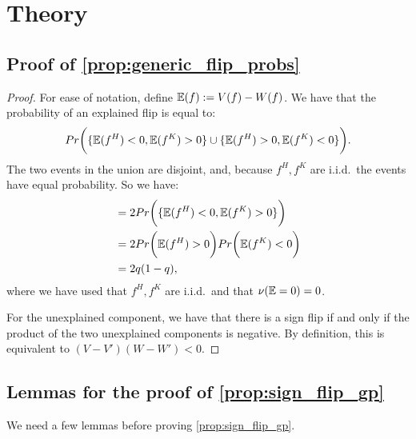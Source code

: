 \section{Theory}
\label{app:theory}

\subsection{Proof of \cref{prop:generic_flip_probs}}

\begin{proof}
	For ease of notation, define $\mathbb{E}(f) := V(f) - W(f)$. We have that the probability of an explained flip is equal to:
	\begin{equation*}
		Pr\bigg( \{\mathbb{E}(f^H) < 0, \mathbb{E}(f^K) > 0 \} \cup \{ \mathbb{E}(f^H) > 0, \mathbb{E}(f^K) < 0\} \bigg).
	\end{equation*}
	The two events in the union are disjoint, and, because $f^H, f^K$ are i.i.d.\, the events have equal probability. So we have:
	\begin{align*}
		&= 2 Pr\bigg( \{\mathbb{E}(f^H) < 0, \mathbb{E}(f^K) > 0 \} \bigg) \\
		&= 2 Pr\bigg( \mathbb{E}(f^H) > 0 \bigg) Pr\bigg( \mathbb{E}(f^K) < 0 \bigg) \\
		&= 2 q (1 - q),
	\end{align*}
	where we have used that $f^H, f^K$ are i.i.d.\ and that $\nu(\mathbb{E} = 0) = 0$.
	
	For the unexplained component, we have that there is a sign flip if and only if the product of the two unexplained components is negative. By definition, this is equivalent to $(V - V')(W - W') < 0$.
\end{proof}

\subsection{Lemmas for the proof of \cref{prop:sign_flip_gp}}

We need a few lemmas before proving \cref{prop:sign_flip_gp}.

